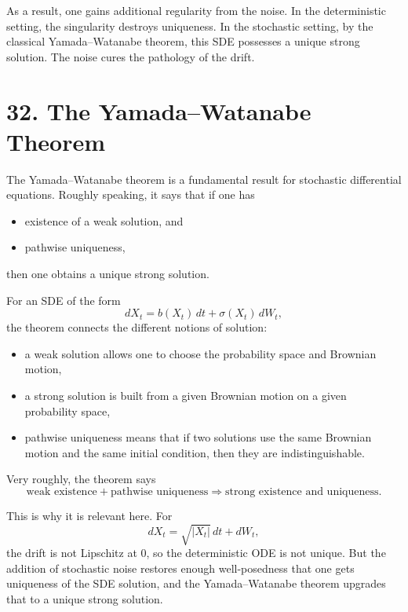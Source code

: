 \documentclass[11pt]{article}
\theoremstyle{definition}
\theoremstyle{remark}
\begin{document}
As a result, one gains additional regularity from the noise. In the deterministic setting, the singularity destroys uniqueness. In the stochastic setting, by the classical Yamada--Watanabe theorem, this SDE possesses a unique strong solution. The noise cures the pathology of the drift.

\section*{32. The Yamada--Watanabe Theorem}
The Yamada--Watanabe theorem is a fundamental result for stochastic differential equations. Roughly speaking, it says that if one has
\begin{itemize}
\item existence of a weak solution, and
\item pathwise uniqueness,
\end{itemize}
then one obtains a unique strong solution.

For an SDE of the form
\[
dX_t=b(X_t)\,dt+\sigma(X_t)\,dW_t,
\]
the theorem connects the different notions of solution:
\begin{itemize}
\item a weak solution allows one to choose the probability space and Brownian motion,
\item a strong solution is built from a given Brownian motion on a given probability space,
\item pathwise uniqueness means that if two solutions use the same Brownian motion and the same initial condition, then they are indistinguishable.
\end{itemize}

Very roughly, the theorem says
\[
\text{weak existence}+\text{pathwise uniqueness}
\Longrightarrow
\text{strong existence and uniqueness}.
\]

This is why it is relevant here. For
\[
dX_t=\sqrt{|X_t|}\,dt+dW_t,
\]
the drift is not Lipschitz at $0$, so the deterministic ODE is not unique. But the addition of stochastic noise restores enough well-posedness that one gets uniqueness of the SDE solution, and the Yamada--Watanabe theorem upgrades that to a unique strong solution.
\end{document}
